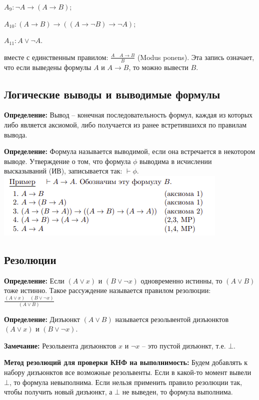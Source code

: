 $A_{9}:\neg A\rightarrow (A\rightarrow B)$;

$A_{{10}}:(A\rightarrow B)\rightarrow ((A\rightarrow \neg B)\rightarrow \neg A)$;

$A_{{11}}:A\vee \neg A$.

вместе с единственным правилом: $\frac{A \quad A\rightarrow B}{B}$ (Modus ponens). Эта запись означает, что если выведены формулы $A$ и $A \to B$, то можно вывести $B$.

\subsection{Логические выводы и выводимые формулы}
\textbf{Определение:} Вывод -- конечная последовательность формул, каждая из которых либо является аксиомой, либо получается из ранее встретившихся по правилам вывода.

\textbf{Определение:} Формула называется выводимой, если она встречается в некотором выводе. Утверждение о том, что формула $\phi$ выводима в исчислении высказываний (ИВ), записывается так: $\vdash \phi$. \newline \includegraphics[width=0.6\linewidth]{images/1_definitions_mp}


\subsection{Резолюции}
\textbf{Определение:} Если $(A \lor x)$ и $(B \lor \neg x)$ одновременно истинны, то $(A \lor B)$ тоже истинно. Такое рассуждение называется правилом резолюции: $\frac{(A \lor x) \quad (B \lor \neg x)}{(A \lor B)}$

\textbf{Определение:} Дизъюнкт $(A \lor B)$ называется резольвентой дизъюнктов $(A \lor x)$ и $(B \lor \neg x)$.

\textbf{Замечание:} Резольвента дизъюнктов $x$ и $\neg x$ -- это пустой дизъюнкт, т.е. $\bot$.

\textbf{Метод резолюций для проверки КНФ на выполнимость:} Будем добавлять к набору дизъюнктов все возможные резольвенты. \newline Если в какой-то момент вывели $\bot$, то формула невыполнима. \newline Если нельзя применить правило резолюции так, чтобы получить новый дизъюнкт, а $\bot$ не выведен, то формула выполнима.

